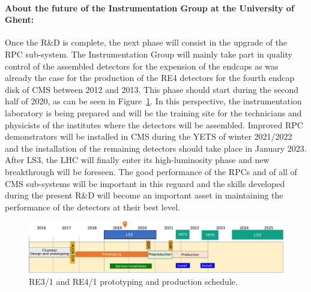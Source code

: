 	\paragraph*{About the future of the Instrumentation Group at the University of Ghent:} Once the R\&D is complete, the next phase will consist in the upgrade of the RPC sub-system. The Instrumentation Group will mainly take part in quality control of the assembled detectors for the expension of the endcaps as was already the case for the production of the RE4 detectors for the fourth endcap disk of CMS between 2012 and 2013. This phase should start during the second half of 2020, as can be seen in Figure~\ref{fig:milestones}. In this perspective, the instrumentation laboratory is being prepared and will be the training site for the technicians and physicists of the institutes where the detectors will be assembled. Improved RPC demonstrators will be installed in CMS during the \acl{YETS} of winter 2021/2022 and the installation of the remaining detectors should take place in January 2023. After LS3, the LHC will finally enter its high-luminosity phase and new breakthrough will be foreseen. The good performance of the RPCs and of all of CMS sub-systems will be important in this reguard and the skills developed during the present R\&D will become an important asset in maintaining the performance of the detectors at their best level.
	
	\begin{figure}[H]
	    \centering
	    \includegraphics[width=\linewidth]{fig/chapt7/CMS-RPC-Milestones.pdf}
	    \caption{\label{fig:milestones} RE3/1 and RE4/1 prototyping and production schedule.}
	\end{figure}

\clearpage{\pagestyle{empty}\cleardoublepage}